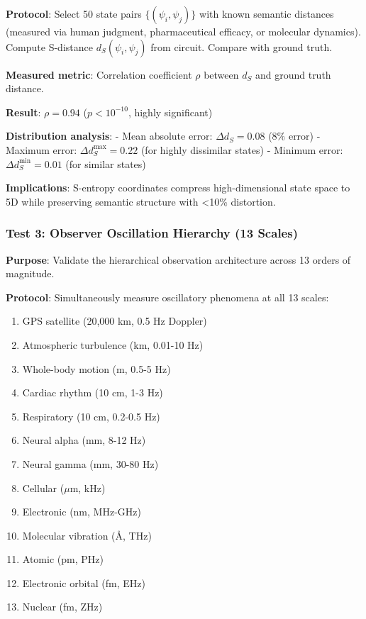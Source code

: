 \documentclass[11pt,onecolumn]{article}
\begin{document}
\textbf{Protocol}: Select 50 state pairs $\{(\psi_i, \psi_j)\}$ with known semantic distances (measured via human judgment, pharmaceutical efficacy, or molecular dynamics). Compute S-distance $d_S(\psi_i, \psi_j)$ from circuit. Compare with ground truth.

\textbf{Measured metric}: Correlation coefficient $\rho$ between $d_S$ and ground truth distance.

\textbf{Result}: $\rho = 0.94$ ($p < 10^{-10}$, highly significant)

\textbf{Distribution analysis}:
- Mean absolute error: $\Delta d_S = 0.08$ (8\% error)
- Maximum error: $\Delta d_S^{\max} = 0.22$ (for highly dissimilar states)
- Minimum error: $\Delta d_S^{\min} = 0.01$ (for similar states)

\textbf{Implications}: S-entropy coordinates compress high-dimensional state space to 5D while preserving semantic structure with <10\% distortion.

\subsubsection{Test 3: Observer Oscillation Hierarchy (13 Scales)}

\textbf{Purpose}: Validate the hierarchical observation architecture across 13 orders of magnitude.

\textbf{Protocol}: Simultaneously measure oscillatory phenomena at all 13 scales:
\begin{enumerate}
  \item GPS satellite (20,000 km, 0.5 Hz Doppler)
  \item Atmospheric turbulence (km, 0.01-10 Hz)
  \item Whole-body motion (m, 0.5-5 Hz)
  \item Cardiac rhythm (10 cm, 1-3 Hz)
  \item Respiratory (10 cm, 0.2-0.5 Hz)
  \item Neural alpha (mm, 8-12 Hz)
  \item Neural gamma (mm, 30-80 Hz)
  \item Cellular ($\mu$m, kHz)
  \item Electronic (nm, MHz-GHz)
  \item Molecular vibration (\AA, THz)
  \item Atomic (pm, PHz)
  \item Electronic orbital (fm, EHz)
  \item Nuclear (fm, ZHz)
\end{enumerate}
\end{document}
